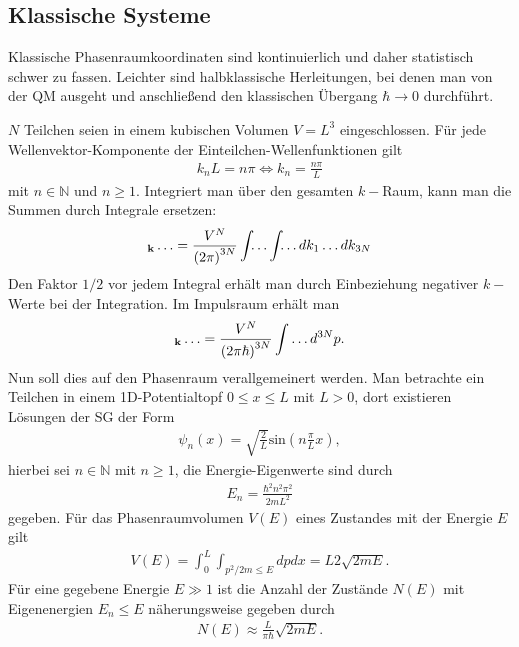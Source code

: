 \documentclass{book}
\renewcommand{\sin}{\text{sin}}
\let\sum\relax
\DeclareMathOperator*{\sum}{\raisebox{-3.5pt}{\scalebox{2}{\rotatebox{1}{{\bask Σ}}}}}
\begin{document}
\subsection{Klassische Systeme}
\label{sec:klassische_systeme}

Klassische Phasenraumkoordinaten sind kontinuierlich und daher statistisch schwer zu fassen. Leichter sind halbklassische Herleitungen, bei denen man von der QM ausgeht und anschließend den klassischen Übergang $\hbar\to0$ durchführt.

$N$ Teilchen seien in einem kubischen Volumen $V = L^3$ eingeschlossen. Für jede Wellenvektor-Komponente der Einteilchen-Wellenfunktionen gilt
%
\begin{eqnarray}
k_nL = n\pi\Leftrightarrow k_n = \frac{n\pi}{L}
\end{eqnarray}
%
mit $n\in\mathbb{N}$ und $n\geq 1$. Integriert man über den gesamten $k-$Raum, kann man die Summen durch Integrale ersetzen:
%
\begin{eqnarray}
\sum_{\mathbf{k}}\dotsc = \frac{V^N}{\left(2\pi\right)^{3N}}\int_{}\dotsc\int_{}\dotsc dk_1\dotsc dk_{3N}
\end{eqnarray}
%
Den Faktor $1/2$ vor jedem Integral erhält man durch Einbeziehung negativer $k-$Werte bei der Integration. Im Impulsraum erhält man
%
\begin{eqnarray}
\sum_{\mathbf{k}}\dotsc = \frac{V^N}{\left(2\pi\hbar\right)^{3N}}\int\dotsc d^{3N}p.
\end{eqnarray}
%
Nun soll dies auf den Phasenraum verallgemeinert werden. Man betrachte ein Teilchen in einem 1D-Potentialtopf $0\leq x\leq L$ mit $L>0$, dort existieren Lösungen der SG der Form
%
\begin{eqnarray}
\psi_n\left(x\right) = \sqrt{\frac{2}{L}}\sin\left(n\frac{\pi}{L}x\right), 
\end{eqnarray}
%
hierbei sei $n\in\mathbb{N}$ mit $n\geq 1$, die Energie-Eigenwerte sind durch
%
\begin{eqnarray}
E_n = \frac{\hbar^2n^2\pi^2}{2mL^2}
\end{eqnarray}
%
gegeben. Für das Phasenraumvolumen $V\left(E\right)$ eines Zustandes mit der Energie $E$ gilt
%
\begin{eqnarray}
V\left(E\right) = \int_{0}^{L}\int_{p^2/2m\leq E} dpdx = L2\sqrt{2mE}.
\end{eqnarray}
%
Für eine gegebene Energie $E\gg 1$ ist die Anzahl der Zustände $N\left(E\right)$ mit Eigenenergien $E_n\leq E$ näherungsweise gegeben durch
%
\begin{eqnarray}
N\left(E\right)\approx\frac{L}{\pi\hbar}\sqrt{2mE}.
\end{eqnarray}
\end{document}
